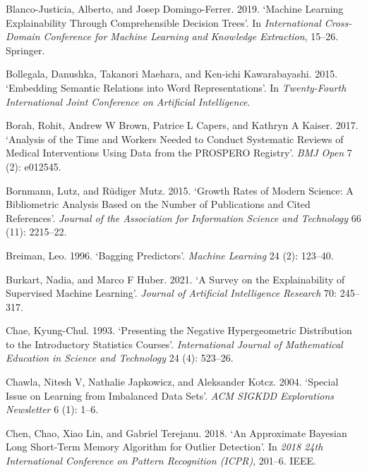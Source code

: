 \documentclass{article}
\newlength{\cslhangindent}
\newenvironment{CSLReferences}[2] %
 {%
  \setlength{\parindent}{0pt}
  \ifodd #1 \everypar{\setlength{\hangindent}{\cslhangindent}}\ignorespaces\fi
  \ifnum #2 > 0
  \setlength{\parskip}{#2\baselineskip}
  \fi
 }%
 {}
\begin{document}
\begin{CSLReferences}{1}{0}
\leavevmode{}%
Blanco-Justicia, Alberto, and Josep Domingo-Ferrer. 2019. {`Machine
Learning Explainability Through Comprehensible Decision Trees'}. In
\emph{International Cross-Domain Conference for Machine Learning and
Knowledge Extraction}, 15--26. Springer.

\leavevmode{}%
Bollegala, Danushka, Takanori Maehara, and Ken-ichi Kawarabayashi. 2015.
{`Embedding Semantic Relations into Word Representations'}. In
\emph{Twenty-Fourth International Joint Conference on Artificial
Intelligence}.

\leavevmode{}%
Borah, Rohit, Andrew W Brown, Patrice L Capers, and Kathryn A Kaiser.
2017. {`Analysis of the Time and Workers Needed to Conduct Systematic
Reviews of Medical Interventions Using Data from the PROSPERO
Registry'}. \emph{BMJ Open} 7 (2): e012545.

\leavevmode{}%
Bornmann, Lutz, and Rüdiger Mutz. 2015. {`Growth Rates of Modern
Science: A Bibliometric Analysis Based on the Number of Publications and
Cited References'}. \emph{Journal of the Association for Information
Science and Technology} 66 (11): 2215--22.

\leavevmode{}%
Breiman, Leo. 1996. {`Bagging Predictors'}. \emph{Machine Learning} 24
(2): 123--40.

\leavevmode{}%
Burkart, Nadia, and Marco F Huber. 2021. {`A Survey on the
Explainability of Supervised Machine Learning'}. \emph{Journal of
Artificial Intelligence Research} 70: 245--317.

\leavevmode{}%
Chae, Kyung-Chul. 1993. {`Presenting the Negative Hypergeometric
Distribution to the Introductory Statistics Courses'}.
\emph{International Journal of Mathematical Education in Science and
Technology} 24 (4): 523--26.

\leavevmode{}%
Chawla, Nitesh V, Nathalie Japkowicz, and Aleksander Kotcz. 2004.
{`Special Issue on Learning from Imbalanced Data Sets'}. \emph{ACM
SIGKDD Explorations Newsletter} 6 (1): 1--6.

\leavevmode{}%
Chen, Chao, Xiao Lin, and Gabriel Terejanu. 2018. {`An Approximate
Bayesian Long Short-Term Memory Algorithm for Outlier Detection'}. In
\emph{2018 24th International Conference on Pattern Recognition (ICPR)},
201--6. IEEE.


\end{CSLReferences}
\end{document}
